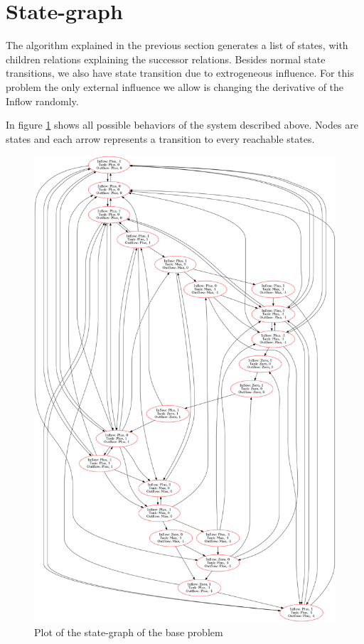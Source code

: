 \documentclass[a4paper]{article}
\begin{document}
\section{State-graph}
The algorithm explained in the previous section generates a list of states, with children relations explaining the successor relations. Besides normal state transitions, we also have state transition due to extrogeneous influence. For this problem the only external influence we allow is changing the derivative of the Inflow randomly.

In figure \ref{state-graph-base} shows all possible behaviors of the system described above. Nodes are states and each arrow represents a transition to every reachable states.

\begin{figure}\label{state-graph-base}
\centering
\includegraphics[width=\textwidth,height=\textheight,keepaspectratio]{result_base_problem.png}
\caption{Plot of the state-graph of the base problem}
\end{figure}
\end{document}
